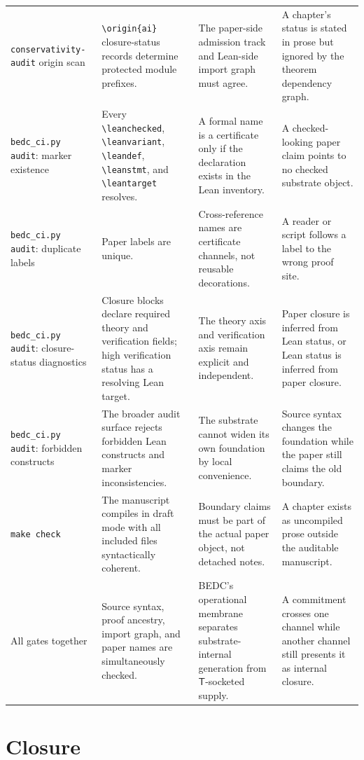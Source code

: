 \begin{longtable}{p{}p{}p{}p{}}
\texttt{conservativity-audit} origin scan & \texttt{\textbackslash origin\{ai\}} closure-status records determine protected module prefixes. & The paper-side admission track and Lean-side import graph must agree. & A chapter's status is stated in prose but ignored by the theorem dependency graph. \\
\texttt{bedc\_ci.py audit}: marker existence & Every \texttt{\textbackslash leanchecked}, \texttt{\textbackslash leanvariant}, \texttt{\textbackslash leandef}, \texttt{\textbackslash leanstmt}, and \texttt{\textbackslash leantarget} resolves. & A formal name is a certificate only if the declaration exists in the Lean inventory. & A checked-looking paper claim points to no checked substrate object. \\
\texttt{bedc\_ci.py audit}: duplicate labels & Paper labels are unique. & Cross-reference names are certificate channels, not reusable decorations. & A reader or script follows a label to the wrong proof site. \\
\texttt{bedc\_ci.py audit}: closure-status diagnostics & Closure blocks declare required theory and verification fields; high verification status has a resolving Lean target. & The theory axis and verification axis remain explicit and independent. & Paper closure is inferred from Lean status, or Lean status is inferred from paper closure. \\
\texttt{bedc\_ci.py audit}: forbidden constructs & The broader audit surface rejects forbidden Lean constructs and marker inconsistencies. & The substrate cannot widen its own foundation by local convenience. & Source syntax changes the foundation while the paper still claims the old boundary. \\
\texttt{make check} & The manuscript compiles in draft mode with all included files syntactically coherent. & Boundary claims must be part of the actual paper object, not detached notes. & A chapter exists as uncompiled prose outside the auditable manuscript. \\
All gates together & Source syntax, proof ancestry, import graph, and paper names are simultaneously checked. & BEDC's operational membrane separates substrate-internal generation from $\mathsf{T}$-socketed supply. & A commitment crosses one channel while another channel still presents it as internal closure. \\
\bottomrule
\end{longtable}

\section{Closure}
\label{sec:audit-gates-closure}


